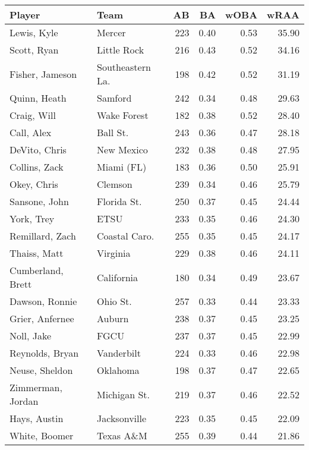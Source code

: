 \documentclass[12pt]{article}
\begin{document}
\clearpage
	

\begin{landscape}
\begin{table}
\begin{minipage}{.5\linewidth}
		\centering
	\begin{tabular}{llrrrr}
		\hline
		Player & Team & AB & BA & wOBA & wRAA \\ 
		\hline
		Lewis, Kyle & Mercer & 223 & 0.40 & 0.53 & 35.90 \\ 
		Scott, Ryan & Little Rock & 216 & 0.43 & 0.52 & 34.16 \\ 
		Fisher, Jameson & Southeastern La. & 198 & 0.42 & 0.52 & 31.19 \\ 
		Quinn, Heath & Samford & 242 & 0.34 & 0.48 & 29.63 \\ 
		Craig, Will & Wake Forest & 182 & 0.38 & 0.52 & 28.40 \\ 
		Call, Alex & Ball St. & 243 & 0.36 & 0.47 & 28.18 \\ 
		DeVito, Chris & New Mexico & 232 & 0.38 & 0.48 & 27.95 \\ 
		Collins, Zack & Miami (FL) & 183 & 0.36 & 0.50 & 25.91 \\ 
		Okey, Chris & Clemson & 239 & 0.34 & 0.46 & 25.79 \\ 
		Sansone, John & Florida St. & 250 & 0.37 & 0.45 & 24.44 \\ 
		York, Trey & ETSU & 233 & 0.35 & 0.46 & 24.30 \\ 
		Remillard, Zach & Coastal Caro. & 255 & 0.35 & 0.45 & 24.17 \\ 
		Thaiss, Matt & Virginia & 229 & 0.38 & 0.46 & 24.11 \\ 
		Cumberland, Brett & California & 180 & 0.34 & 0.49 & 23.67 \\ 
		Dawson, Ronnie & Ohio St. & 257 & 0.33 & 0.44 & 23.33 \\ 
		Grier, Anfernee & Auburn & 238 & 0.37 & 0.45 & 23.25 \\ 
		Noll, Jake & FGCU & 237 & 0.37 & 0.45 & 22.99 \\ 
		Reynolds, Bryan & Vanderbilt & 224 & 0.33 & 0.46 & 22.98 \\ 
		Neuse, Sheldon & Oklahoma & 198 & 0.37 & 0.47 & 22.65 \\ 
		Zimmerman, Jordan & Michigan St. & 219 & 0.37 & 0.46 & 22.52 \\ 
		Hays, Austin & Jacksonville & 223 & 0.35 & 0.45 & 22.09 \\ 
		White, Boomer & Texas A\&M & 255 & 0.39 & 0.44 & 21.86 \\ 

\end{tabular}
\end{minipage}
\end{table}
\end{landscape}
\end{document}
